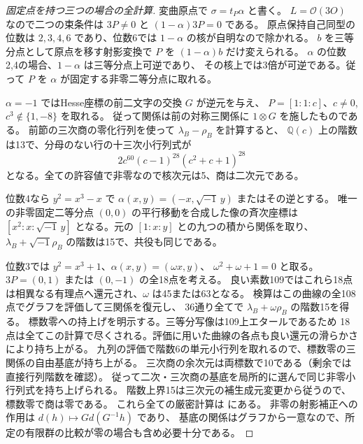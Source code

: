 \begin{proof}[固定点を持つ三つの場合の全計算]
変曲原点で $\sigma=t_P\alpha$ と書く。
$L=\mathcal O(3O)$ なので二つの束条件は $3P\ne0$ と $(1-\alpha)3P=0$ である。
原点保持自己同型の位数は $2,3,4,6$ であり、位数6では $1-\alpha$ の核が自明なので除かれる。
$b$ を三等分点として原点を移す射影変換で $P$ を $(1-\alpha)b$ だけ変えられる。
$\alpha$ の位数2,4の場合、$1-\alpha$ は三等分点上可逆であり、
その核上では3倍が可逆である。従って $P$ を $\alpha$ が固定する非零二等分点に取れる。

$\alpha=-1$ ではHesse座標の前二文字の交換 $G$ が逆元を与え、
$P=[1:1:c]$、$c\ne0$, $c^3\notin\{1,-8\}$ を取れる。
従って関係は前の対称三関係に $1\otimes G$ を施したものである。
前節の三次商の零化行列を使って $\lambda_B-\rho_B$ を計算すると、
$\mathbb Q(c)$ 上の階数は13で、分母のない行の十三次小行列式が
\[
                       2 c^{60}(c-1)^{28}(c^2+c+1)^{28}
\]
となる。全ての許容値で非零なので核次元は5、商は二次元である。

位数4なら $y^2=x^3-x$ で $\alpha(x,y)=(-x,\sqrt{-1}\,y)$ またはその逆とする。
唯一の非零固定二等分点 $(0,0)$ の平行移動を合成した像の斉次座標は
$[x^2:x:\sqrt{-1}\,y]$ となる。元の $[1:x:y]$ との九つの積から関係を取り、
$\lambda_B+\sqrt{-1}\rho_B$ の階数は15で、共役も同じである。

位数3では $y^2=x^3+1$、$\alpha(x,y)=(\omega x,y)$、
$\omega^2+\omega+1=0$ と取る。$3P=(0,1)$ または $(0,-1)$ の全18点を考える。
良い素数109ではこれら18点は相異なる有理点へ還元され、$\omega$ は45または63となる。
検算はこの曲線の全108点でグラフを評価して三関係を復元し、
36通り全てで $\lambda_B+\omega\rho_B$ の階数15を得る。
標数零への持上げを明示する。三等分写像は109上エタールであるため
18点は全てこの計算で尽くされる。評価に用いた曲線の各点も良い還元の滑らかさにより持ち上がる。
九列の評価で階数6の単元小行列を取れるので、標数零の三関係の自由基底が持ち上がる。
三次商の余次元は両標数で10である（剰余では直接行列階数を確認）。
従って二次・三次商の基底を局所的に選んで同じ非零小行列式を持ち上げられる。
階数上界15は三次元の補生成元変更から従うので、標数零で商は零である。
これら全ての厳密計算は  にある。
非零の射影補正への作用は $d(h)\mapsto Gd(G^{-1}h)$ であり、
基底の関係はグラフから一意なので、所定の有限群の比較が零の場合も含め必要十分である。
\end{proof}
